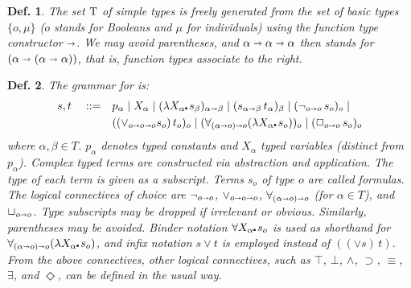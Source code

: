 \documentclass{ecai2014}
\newtheorem{definition}{Def.}
\def\lambdot{\rule{0.6mm}{0.6mm}\hspace{0.4ex}}
\def\all#1{\forall #1\lambdot}
\def\lam#1{\lambda #1\lambdot}
\def\modal#1{#1}
\def\mnot{\modal\neg\,}
\def\mor{\,\modal\vee\,}
\def\mball#1{\modal\Box_{#1}\,}
\newcommand\entity[1]{\text{\textrm{#1}}}
\def\IV{\entity{IV}}
\def\PV{\entity{PV}}
\def\SYM{\entity{SYM}}
\def\HOML{\entity{HOML}\xspace}
\def\ar{\shortrightarrow}
\begin{document}


\begin{definition}\label{homltypes} The set $\entity{T}$ of \emph{simple
    types} is freely generated from the set of basic types $\{o,
  \mu\}$ ($o$ stands for Booleans and $\mu$ for individuals) using the
  function type constructor $\ar$. We may avoid parentheses, and
  $\alpha\ar\alpha\ar\alpha$ then stands for
  $(\alpha\ar(\alpha\ar\alpha))$, that is, function types associate to
  the right.
\end{definition} 

\begin{definition}\label{homlgrammar}
The \emph{grammar} for \HOML is:
\begin{align*} 
  s,t \quad ::= \quad & p_\alpha \mid X_\alpha \mid (\lam{X_\alpha}
  s_\beta)_{\alpha\ar\beta} \mid (s_{\alpha\ar\beta}\, t_\alpha)_\beta
  \mid (\neg_{o\ar o}\, s_o)_o \mid \\
  & ((\vee_{o\ar o\ar o} s_o)\, t_o)_o  
  \mid (\forall_{(\alpha\ar
    o)\ar o}(\lam{X_\alpha} s_o))_o  \mid (\Box_{o\ar o}\, s_o)_o
\end{align*}
where $\alpha,\beta\in T$.  $p_\alpha$ denotes typed constants and
$X_\alpha$ typed variables (distinct from $p_\alpha$).  Complex typed
terms are constructed via abstraction and application. The type of
each term is given as a subscript.  Terms $s_o$ of type $o$ are called
formulas.  The logical connectives of choice are
$\neg_{o\ar o}$, $\vee_{o\ar
  o\ar o}$, $\forall_{(\alpha\ar
  o)\ar o}$ (for $\alpha\in T$), and
$\Box_{o\ar o}$.  Type subscripts may be dropped if
irrelevant or obvious. Similarly, parentheses may be avoided.  Binder
notation $\all{X_\alpha} s_o$ is used as shorthand for
$\forall_{(\alpha\ar o)\ar o}
(\lam{X_\alpha} s_o)$, and infix notation $s \vee t$ is employed
instead of $((\vee s)\, t)$. From the above connectives, other logical
connectives, such as $\top$, $\bot$, $\wedge$, $\supset$, $\equiv$, $\exists$,
and $\Diamond$, can be defined in the usual way.
\end{definition}
\end{document}
